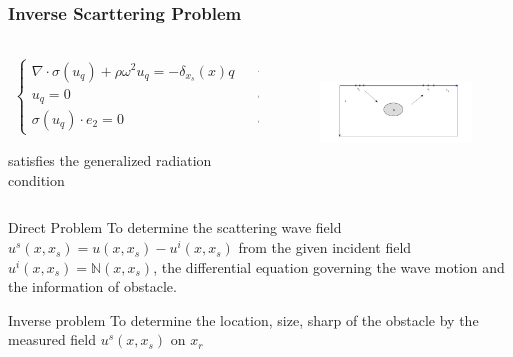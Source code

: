 \documentclass[utf-8,8pt]{beamer}
\newcommand{\R}{\mathbb{R}}
\newcommand{\Ga}{\Gamma}
\newcommand{\bks}{\backslash}
\newcommand{\N}{\mathbb{N}}
\begin{document}
\begin{frame}
\frametitle{Inverse Scarttering Problem}
\begin{columns}
\begin{column}{.5\textwidth}

\begin{tiny}
\begin{eqnarray*}
\left\{
\begin{array}{lll}
\nabla\cdot\sigma(u_q) + \rho\omega^2u_q= -\delta_{x_s}(x)q \ \ \ \ &in&\R_+^2\bks \bar{D}\\
u_q=0 \ \  \ \ \ \ \ \ \ &on& \ \Ga_D  \ \ \\
\sigma(u_q)\cdot e_2=0 \ \ &on& \ \Ga_0
\end{array}
\right.
\end{eqnarray*}
\end{tiny}
\small{satisfies the generalized radiation condition}
\end{column}

\begin{column}{.5\textwidth}
\begin{figure}
  \centering
  \includegraphics[width=6cm,height=3cm]{./figure/half_forward}
\end{figure}
\end{column}
\end{columns}
\begin{block}{Direct Problem}
To determine the scattering wave field $u^s(x,x_s)=u(x,x_s)-u^i(x,x_s)$ from the given incident field $u^i(x,x_s)=\N(x,x_s)$,
the differential equation governing the wave motion and the information of obstacle.
\end{block}
\begin{block}{Inverse problem}
To determine the location, size, sharp of the obstacle by the measured field $u^s(x,x_s)$ on $x_r$
\end{block}
\end{frame}
\end{document}
